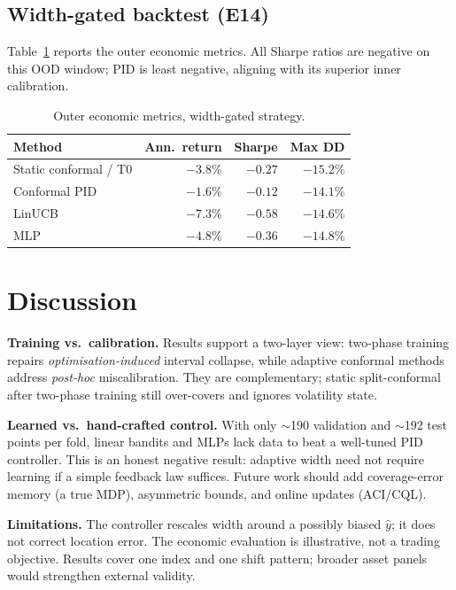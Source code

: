 \documentclass[conference]{IEEEtran}
\begin{document}
\subsection{Width-gated backtest (E14)}
Table~\ref{tab:e14} reports the outer economic metrics. All Sharpe ratios are negative on this OOD
window; PID is least negative, aligning with its superior inner calibration.

\begin{table}[t]
  \centering
  \caption{Outer economic metrics, width-gated strategy.}
  \label{tab:e14}
  \begin{tabular}{@{}lrrr@{}}
    \toprule
    Method & Ann.\ return & Sharpe & Max DD \\
    \midrule
    Static conformal / T0 & $-3.8\%$ & $-0.27$ & $-15.2\%$ \\
    Conformal PID         & $-1.6\%$ & $-0.12$ & $-14.1\%$ \\
    LinUCB                & $-7.3\%$ & $-0.58$ & $-14.6\%$ \\
    MLP                   & $-4.8\%$ & $-0.36$ & $-14.8\%$ \\
    \bottomrule
  \end{tabular}
\end{table}

\section{Discussion}
\label{sec:discussion}
\textbf{Training vs.\ calibration.} Results support a two-layer view: two-phase training repairs
\emph{optimisation-induced} interval collapse, while adaptive conformal methods address
\emph{post-hoc} miscalibration. They are complementary; static split-conformal after two-phase
training still over-covers and ignores volatility state.

\textbf{Learned vs.\ hand-crafted control.} With only $\sim$190 validation and $\sim$192 test
points per fold, linear bandits and MLPs lack data to beat a well-tuned PID controller. This is an
honest negative result: adaptive width need not require learning if a simple feedback law
suffices. Future work should add coverage-error memory (a true MDP), asymmetric bounds, and online
updates (ACI/CQL).

\textbf{Limitations.} The controller rescales width around a possibly biased $\hat{y}$; it does not
correct location error. The economic evaluation is illustrative, not a trading objective. Results
cover one index and one shift pattern; broader asset panels would strengthen external validity.
\end{document}
